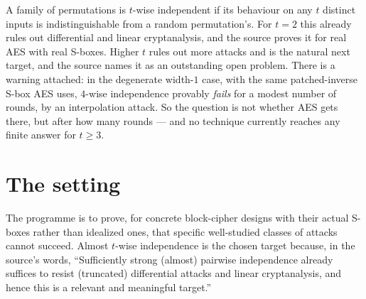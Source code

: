 \documentclass{aicr-conjecture}
\begin{document}

\vspace{0.4em}

\begin{informalconjecture}
A family of permutations is $t$-wise independent if its behaviour on any
$t$ distinct inputs is indistinguishable from a random permutation's.
For $t = 2$ this already rules out differential and linear cryptanalysis,
and the source proves it for real AES with real S-boxes. Higher $t$ rules
out more attacks and is the natural next target, and the source names it
as an outstanding open problem. There is a warning attached: in the
degenerate width-$1$ case, with the same patched-inverse S-box AES uses,
$4$-wise independence provably \emph{fails} for a modest number of
rounds, by an interpolation attack. So the question is not whether AES
gets there, but after how many rounds --- and no technique currently
reaches any finite answer for $t \ge 3$.
\end{informalconjecture}

\section{The setting}\label{sec:setting}

The programme is to prove, for concrete block-cipher designs with their
actual S-boxes rather than idealized ones, that specific well-studied
classes of attacks cannot succeed. Almost $t$-wise independence is the
chosen target because, in the source's words, ``Sufficiently strong
(almost) pairwise independence already suffices to resist (truncated)
differential attacks and linear cryptanalysis, and hence this is a
relevant and meaningful target.''
\end{document}
